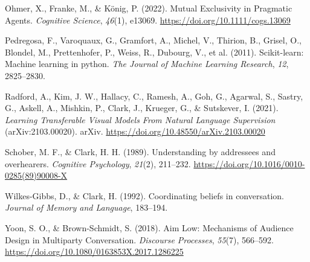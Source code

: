 \documentclass[10pt, letterpaper]{article}
\begin{document}
\begin{CSLReferences}{1}{0}
Ohmer, X., Franke, M., \& König, P. (2022). Mutual {Exclusivity} in
{Pragmatic Agents}. \emph{Cognitive Science}, \emph{46}(1), e13069.
\url{https://doi.org/10.1111/cogs.13069}

Pedregosa, F., Varoquaux, G., Gramfort, A., Michel, V., Thirion, B.,
Grisel, O., Blondel, M., Prettenhofer, P., Weiss, R., Dubourg, V., et
al. (2011). Scikit-learn: {Machine} learning in python. \emph{The
Journal of Machine Learning Research}, \emph{12}, 2825--2830.

Radford, A., Kim, J. W., Hallacy, C., Ramesh, A., Goh, G., Agarwal, S.,
Sastry, G., Askell, A., Mishkin, P., Clark, J., Krueger, G., \&
Sutskever, I. (2021). \emph{Learning {Transferable Visual Models From
Natural Language Supervision}} (arXiv:2103.00020). arXiv.
\url{https://doi.org/10.48550/arXiv.2103.00020}

Schober, M. F., \& Clark, H. H. (1989). Understanding by addressees and
overhearers. \emph{Cognitive Psychology}, \emph{21}(2), 211--232.
\url{https://doi.org/10.1016/0010-0285(89)90008-X}

Wilkes-Gibbs, D., \& Clark, H. (1992). Coordinating beliefs in
conversation. \emph{Journal of Memory and Language}, 183--194.

Yoon, S. O., \& Brown-Schmidt, S. (2018). Aim {Low}: {Mechanisms} of
{Audience Design} in {Multiparty Conversation}. \emph{Discourse
Processes}, \emph{55}(7), 566--592.
\url{https://doi.org/10.1080/0163853X.2017.1286225}

\end{CSLReferences}


\end{document}
